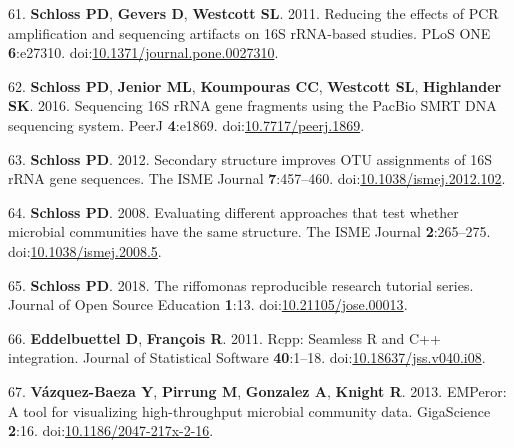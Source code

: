 \documentclass[11pt,]{article}
\begin{document}
\leavevmode\hypertarget{ref-Schloss2011b}{}%
61. \textbf{Schloss PD}, \textbf{Gevers D}, \textbf{Westcott SL}. 2011.
Reducing the effects of PCR amplification and sequencing artifacts on
16S rRNA-based studies. PLoS ONE \textbf{6}:e27310.
doi:\href{https://doi.org/10.1371/journal.pone.0027310}{10.1371/journal.pone.0027310}.

\leavevmode\hypertarget{ref-Schloss2016b}{}%
62. \textbf{Schloss PD}, \textbf{Jenior ML}, \textbf{Koumpouras CC},
\textbf{Westcott SL}, \textbf{Highlander SK}. 2016. Sequencing 16S rRNA
gene fragments using the PacBio SMRT DNA sequencing system. PeerJ
\textbf{4}:e1869.
doi:\href{https://doi.org/10.7717/peerj.1869}{10.7717/peerj.1869}.

\leavevmode\hypertarget{ref-Schloss2012a}{}%
63. \textbf{Schloss PD}. 2012. Secondary structure improves OTU
assignments of 16S rRNA gene sequences. The ISME Journal
\textbf{7}:457--460.
doi:\href{https://doi.org/10.1038/ismej.2012.102}{10.1038/ismej.2012.102}.

\leavevmode\hypertarget{ref-Schloss2008}{}%
64. \textbf{Schloss PD}. 2008. Evaluating different approaches that test
whether microbial communities have the same structure. The ISME Journal
\textbf{2}:265--275.
doi:\href{https://doi.org/10.1038/ismej.2008.5}{10.1038/ismej.2008.5}.

\leavevmode\hypertarget{ref-Schloss2018a}{}%
65. \textbf{Schloss PD}. 2018. The riffomonas reproducible research
tutorial series. Journal of Open Source Education \textbf{1}:13.
doi:\href{https://doi.org/10.21105/jose.00013}{10.21105/jose.00013}.

\leavevmode\hypertarget{ref-Eddelbuettel2011}{}%
66. \textbf{Eddelbuettel D}, \textbf{François R}. 2011. Rcpp: Seamless R
and C++ integration. Journal of Statistical Software \textbf{40}:1--18.
doi:\href{https://doi.org/10.18637/jss.v040.i08}{10.18637/jss.v040.i08}.

\leavevmode\hypertarget{ref-VzquezBaeza2013}{}%
67. \textbf{Vázquez-Baeza Y}, \textbf{Pirrung M}, \textbf{Gonzalez A},
\textbf{Knight R}. 2013. EMPeror: A tool for visualizing high-throughput
microbial community data. GigaScience \textbf{2}:16.
doi:\href{https://doi.org/10.1186/2047-217x-2-16}{10.1186/2047-217x-2-16}.
\end{document}
